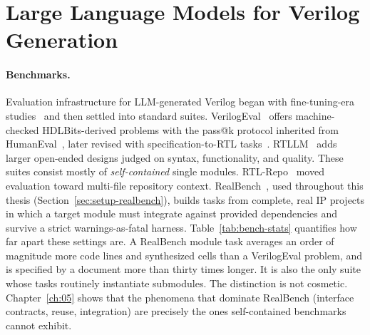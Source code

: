 \section{Large Language Models for Verilog Generation}
\label{sec:rw-llm-verilog}

\paragraph{Benchmarks.}
Evaluation infrastructure for LLM-generated Verilog began with
fine-tuning-era studies~\citep{pearce2020dave, thakur2023verigen} and
then settled into standard suites. VerilogEval~\citep{liu2023verilogeval}
offers machine-checked HDLBits-derived problems with the pass@k protocol
inherited from HumanEval~\citep{chen2021humaneval}, later revised with
specification-to-RTL tasks~\citep{pinckney2025verilogeval2}.
RTLLM~\citep{lu2024rtllm} adds larger open-ended designs judged on syntax,
functionality, and quality. These suites consist mostly of
\emph{self-contained} single modules. RTL-Repo~\citep{allam2024rtlrepo}
moved evaluation toward multi-file repository context.
RealBench~\citep{realbench2025}, used throughout this thesis
(Section~\ref{sec:setup-realbench}), builds tasks from complete, real IP
projects in which a target module must integrate against provided
dependencies and survive a strict warnings-as-fatal harness.
Table~\ref{tab:bench-stats} quantifies how far apart these settings are.
A RealBench module task averages an order of magnitude more code lines
and synthesized cells than a VerilogEval problem, and is specified by a
document more than thirty times longer. It is also the only suite
whose tasks routinely instantiate submodules. The distinction is not cosmetic.
Chapter~\ref{ch:05} shows that the phenomena that dominate RealBench
(interface contracts, reuse, integration) are precisely the ones
self-contained benchmarks cannot exhibit.

